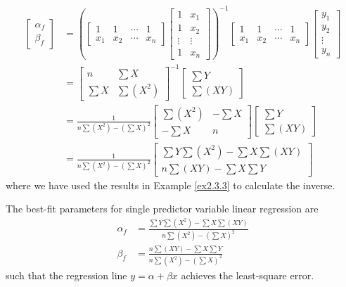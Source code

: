\begin{align*}
\begin{bmatrix}
\alpha_f \\
\beta_f
\end{bmatrix}
& =
\left(
\begin{bmatrix}
1 & 1 & \cdots & 1 \\
x_1 & x_2 & \cdots & x_n
\end{bmatrix}
\begin{bmatrix}
1 & x_1 \\
1 & x_2 \\
\vdots & \vdots \\
1 & x_n
\end{bmatrix} 
\right)^{-1}
\begin{bmatrix}
1 & 1 & \cdots & 1 \\
x_1 & x_2 & \cdots & x_n
\end{bmatrix}
\begin{bmatrix}
y_1 \\
y_2 \\
\vdots \\
y_n
\end{bmatrix} \\
&= 
\begin{bmatrix}
n & \sum X \\
\sum X & \sum (X^2)
\end{bmatrix}^{-1}
\begin{bmatrix}
\sum Y \\
\sum (XY)
\end{bmatrix} \\
&=
\frac{1}{n\sum(X^2) - (\sum X)^2}
\begin{bmatrix}
\sum(X^2) & -\sum X \\
-\sum X & n
\end{bmatrix}
\begin{bmatrix}
\sum Y \\
\sum (XY)
\end{bmatrix} \\
&=
\frac{1}{n\sum(X^2) - (\sum X)^2}
\begin{bmatrix}
\sum Y \sum (X^2) - \sum X \sum (XY) \\
n \sum(XY) - \sum X \sum Y
\end{bmatrix}
\end{align*}
where we have used the results in Example \ref{ex2.3.3} to calculate the inverse.
\begin{proper}
\label{bestfit2}
The best-fit parameters for single predictor variable linear regression are
\begin{align*}
\alpha_f &= \frac{\sum Y \sum (X^2) - \sum X \sum (XY)}{n\sum(X^2) - (\sum X)^2} \\
\beta_f &= \frac{n \sum(XY) - \sum X \sum Y}{n\sum(X^2) - (\sum X)^2}
\end{align*}
such that the regression line $y = \alpha + \beta x$ achieves the least-square error.
\end{proper}
